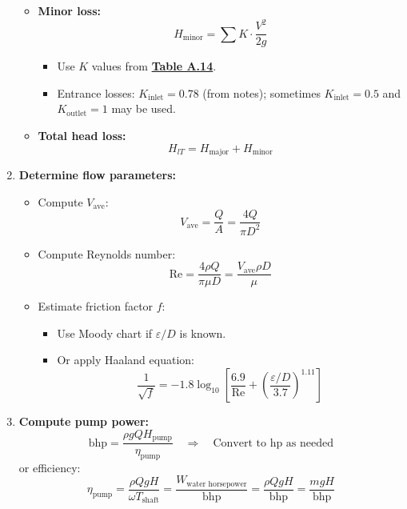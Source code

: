 \begin{multicols*}{2}
\begin{enumerate}
\begin{itemize}
                  \item \textbf{Minor loss:}
                  \[
                      H_{\text{minor}} = \sum K \cdot \frac{V^2}{2g}
                  \]
                  \begin{itemize}
                      \item Use $K$ values from \underline{\textbf{Table A.14}}.
                      \item Entrance losses: $K_{\text{inlet}} = 0.78$ (from notes); sometimes $K_{\text{inlet}} = 0.5$ and $K_{\text{outlet}} = 1$ may be used.
                  \end{itemize}
              
              
                  \item \textbf{Total head loss:}
                  \[
                      H_{lT} = H_{\text{major}} + H_{\text{minor}}
                  \]
              \end{itemize}
              
        \item \textbf{Determine flow parameters:}
              \begin{itemize}
                  \item Compute $V_{\text{ave}}$:
                        \[
                            V_{\text{ave}} = \frac{Q}{A} = \frac{4Q}{\pi D^2}
                        \]
                  \item Compute Reynolds number:
                        \[
                            \text{Re} = \frac{4 \rho Q}{\pi \mu D} = \frac{V_\text{ave} \rho D}{\mu}
                        \]
                  \item Estimate friction factor $f$:
                        \begin{itemize}
                            \item Use Moody chart if $\varepsilon/D$ is known.
                            \item Or apply Haaland equation:
                                  \[
                                      \frac{1}{\sqrt{f}} = -1.8 \log_{10} \left[ \frac{6.9}{\text{Re}} + \left( \frac{\varepsilon/D}{3.7} \right)^{1.11} \right]
                                  \]
                        \end{itemize}
              \end{itemize}

       

        \item \textbf{Compute pump power:}
              \[
                  \text{bhp} = \frac{\rho g Q H_{\text{pump}}}{\eta_{\text{pump}}}
                  \quad \Rightarrow \quad \text{Convert to hp as needed}
              \]
              or efficiency:
              \[
                  \eta_{\text{pump}} = \frac{\rho Q g H}{\omega T_{\text{shaft}}} = \frac{W_{\text{water horsepower}}}{\text{bhp}} = \frac{\rho Q g H}{\text{bhp}} = \frac{mgH}{\text{bhp}}
              \]



\end{enumerate}
\end{multicols*}
